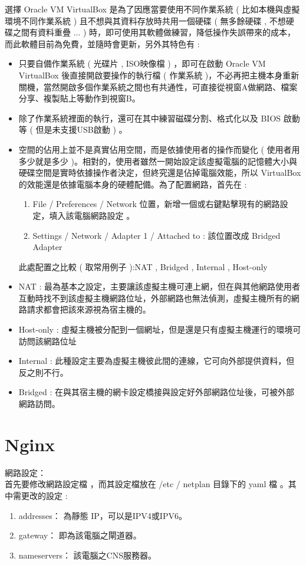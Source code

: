 \documentclass[14pt,a4paper]{report}  %
\begin{document}
 選擇 Oracle VM VirtualBox    是為了因應當要使用不同作業系統 ( 比如本機與虛擬環境不同作業系統  ) 且不想與其資料存放時共用一個硬碟 ( 無多餘硬碟 , 不想硬碟之間有資料重疊 ... ) 時，即可使用其軟體做練習，降低操作失誤帶來的成本，而此軟體目前為免費，並隨時會更新，另外其特色有 :\\  
\begin{itemize}


\item 只要自備作業系統 ( 光碟片 , ISO映像檔 ) ，即可在啟動 Oracle VM VirtualBox  後直接開啟要操作的執行檔 ( 作業系統 )，不必再把主機本身重新關機，當然開啟多個作業系統之間也有共通性，可直接從視窗A做網路、檔案分享、複製貼上等動作到視窗B。\\
\item 除了作業系統裡面的執行，還可在其中練習磁碟分割、格式化以及 BIOS 啟動等 ( 但是未支援USB啟動 ) 。\\
\item 空間的佔用上並不是真實佔用空間，而是依據使用者的操作而變化 ( 使用者用多少就是多少 )。相對的，使用者雖然一開始設定該虛擬電腦的記憶體大小與硬碟空間是實時依據操作者決定，但終究還是佔掉電腦效能，所以 VirtualBox 的效能還是依據電腦本身的硬體配備。為了配置網路，首先在 : \\
\begin{enumerate}
\item File / Preferences / Network  位置，新增一個或右鍵點擊現有的網路設定，填入該電腦網路設定 。
\item Settings / Network / Adapter 1 / Attached to :  該位置改成  Bridged Adapter
\end{enumerate}
\qquad 此處配置之比較 ( 取常用例子 ):NAT , Bridged , Internal , Host-only
\item NAT : 最為基本之設定，主要讓該虛擬主機可連上網，但在與其他網路使用者互動時找不到該虛擬主機網路位址，外部網路也無法偵測，虛擬主機所有的網路請求都會把該來源視為宿主機的。
\item Host-only : 虛擬主機被分配到一個網址，但是還是只有虛擬主機運行的環境可訪問該網路位址
\item Internal : 此種設定主要為虛擬主機彼此間的連線，它可向外部提供資料，但反之則不行。
\item Bridged : 在與其宿主機的網卡設定橋接與設定好外部網路位址後，可被外部網路訪問。
\end{itemize}
\newpage
\section{Nginx}
 網路設定：\\
 首先要修改網路設定檔 ，而其設定檔放在 /etc / netplan 目錄下的 yaml 檔 。其中需更改的設定 :
\begin{enumerate}
\item addresses： 為靜態 IP，可以是IPV4或IPV6。
\item gateway： 即為該電腦之閘道器。
\item nameservers： 該電腦之CNS服務器。
\end{enumerate}
\end{document}
